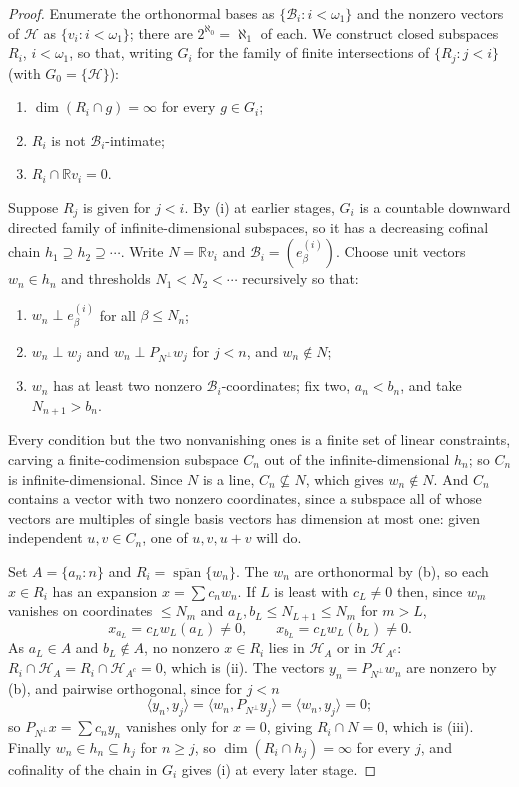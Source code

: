 \documentclass[11pt,reqno]{amsart}
\theoremstyle{definition}
\newcommand{\HH}{\mathcal{H}}
\newcommand{\R}{\mathbb{R}}
\begin{document}
\begin{proof}
Enumerate the orthonormal bases as $\{\mathcal B_i:i<\omega_1\}$ and the nonzero
vectors of $\HH$ as $\{v_i:i<\omega_1\}$; there are $2^{\aleph_0}=\aleph_1$ of each.
We construct closed subspaces $R_i$, $i<\omega_1$, so that, writing $G_i$ for the family
of finite intersections of $\{R_j:j<i\}$ (with $G_0=\{\HH\}$):
\begin{enumerate}
\item[(i)] $\dim(R_i\cap g)=\infty$ for every $g\in G_i$;
\item[(ii)] $R_i$ is not $\mathcal B_i$-intimate;
\item[(iii)] $R_i\cap\R v_i=0$.
\end{enumerate}

Suppose $R_j$ is given for $j<i$. By (i) at earlier stages, $G_i$ is a countable
downward directed family of infinite-dimensional subspaces, so it has a decreasing
cofinal chain $h_1\supseteq h_2\supseteq\cdots$. Write $N=\R v_i$ and
$\mathcal B_i=(e^{(i)}_\beta)$. Choose unit vectors $w_n\in h_n$ and thresholds
$N_1<N_2<\cdots$ recursively so that:
\begin{enumerate}
\item[(a)] $w_n\perp e^{(i)}_\beta$ for all $\beta\le N_n$;
\item[(b)] $w_n\perp w_j$ and $w_n\perp P_{N^\perp}w_j$ for $j<n$, and $w_n\notin N$;
\item[(c)] $w_n$ has at least two nonzero $\mathcal B_i$-coordinates; fix two,
$a_n<b_n$, and take $N_{n+1}>b_n$.
\end{enumerate}
Every condition but the two nonvanishing ones is a finite set of linear constraints,
carving a finite-codimension subspace $C_n$ out of the infinite-dimensional $h_n$; so
$C_n$ is infinite-dimensional. Since $N$ is a line, $C_n\not\subseteq N$, which gives
$w_n\notin N$. And $C_n$ contains a vector with two nonzero coordinates, since a
subspace all of whose vectors are multiples of single basis vectors has dimension at
most one: given independent $u,v\in C_n$, one of $u,v,u+v$ will do.

Set $A=\{a_n:n\}$ and $R_i=\overline{\operatorname{span}}\{w_n\}$. The $w_n$ are
orthonormal by (b), so each $x\in R_i$ has an expansion $x=\sum c_nw_n$. If $L$ is
least with $c_L\neq0$ then, since $w_m$ vanishes on coordinates $\le N_m$ and
$a_L,b_L\le N_{L+1}\le N_m$ for $m>L$,
\[
x_{a_L}=c_Lw_L(a_L)\neq0,\qquad x_{b_L}=c_Lw_L(b_L)\neq0 .
\]
As $a_L\in A$ and $b_L\notin A$, no nonzero $x\in R_i$ lies in $\HH_A$ or in
$\HH_{A^c}$: $R_i\cap\HH_A=R_i\cap\HH_{A^c}=0$, which is (ii). The vectors
$y_n=P_{N^\perp}w_n$ are nonzero by (b), and pairwise orthogonal, since for $j<n$
\[
\langle y_n,y_j\rangle=\langle w_n,P_{N^\perp}y_j\rangle=\langle w_n,y_j\rangle=0 ;
\]
so $P_{N^\perp}x=\sum c_ny_n$ vanishes only for $x=0$, giving $R_i\cap N=0$, which is
(iii). Finally $w_n\in h_n\subseteq h_j$ for $n\ge j$, so
$\dim(R_i\cap h_j)=\infty$ for every $j$, and cofinality of the chain in $G_i$ gives
(i) at every later stage.


\end{proof}
\end{document}
